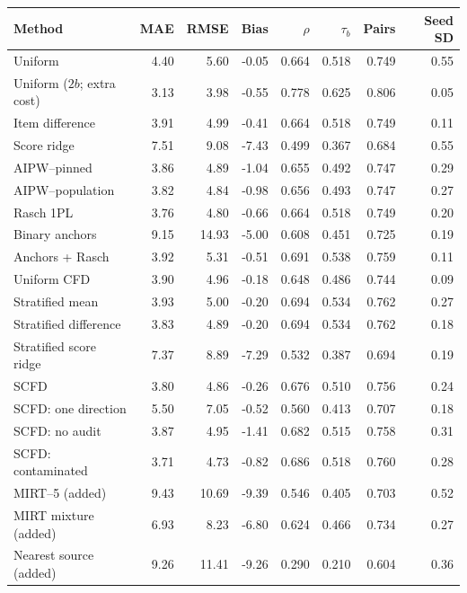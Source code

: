 \begin{tabular}{lrrrrrrr}
\toprule
Method & MAE & RMSE & Bias & $\rho$ & $\tau_b$ & Pairs & Seed SD \\
\midrule
Uniform & 4.40 & 5.60 & -0.05 & 0.664 & 0.518 & 0.749 & 0.55 \\
Uniform ($2b$; extra cost) & 3.13 & 3.98 & -0.55 & 0.778 & 0.625 & 0.806 & 0.05 \\
Item difference & 3.91 & 4.99 & -0.41 & 0.664 & 0.518 & 0.749 & 0.11 \\
Score ridge & 7.51 & 9.08 & -7.43 & 0.499 & 0.367 & 0.684 & 0.55 \\
AIPW--pinned & 3.86 & 4.89 & -1.04 & 0.655 & 0.492 & 0.747 & 0.29 \\
AIPW--population & 3.82 & 4.84 & -0.98 & 0.656 & 0.493 & 0.747 & 0.27 \\
Rasch 1PL & 3.76 & 4.80 & -0.66 & 0.664 & 0.518 & 0.749 & 0.20 \\
Binary anchors & 9.15 & 14.93 & -5.00 & 0.608 & 0.451 & 0.725 & 0.19 \\
Anchors + Rasch & 3.92 & 5.31 & -0.51 & 0.691 & 0.538 & 0.759 & 0.11 \\
Uniform CFD & 3.90 & 4.96 & -0.18 & 0.648 & 0.486 & 0.744 & 0.09 \\
Stratified mean & 3.93 & 5.00 & -0.20 & 0.694 & 0.534 & 0.762 & 0.27 \\
Stratified difference & 3.83 & 4.89 & -0.20 & 0.694 & 0.534 & 0.762 & 0.18 \\
Stratified score ridge & 7.37 & 8.89 & -7.29 & 0.532 & 0.387 & 0.694 & 0.19 \\
SCFD & 3.80 & 4.86 & -0.26 & 0.676 & 0.510 & 0.756 & 0.24 \\
SCFD: one direction & 5.50 & 7.05 & -0.52 & 0.560 & 0.413 & 0.707 & 0.18 \\
SCFD: no audit & 3.87 & 4.95 & -1.41 & 0.682 & 0.515 & 0.758 & 0.31 \\
SCFD: contaminated & 3.71 & 4.73 & -0.82 & 0.686 & 0.518 & 0.760 & 0.28 \\
MIRT--5 (added) & 9.43 & 10.69 & -9.39 & 0.546 & 0.405 & 0.703 & 0.52 \\
MIRT mixture (added) & 6.93 & 8.23 & -6.80 & 0.624 & 0.466 & 0.734 & 0.27 \\
Nearest source (added) & 9.26 & 11.41 & -9.26 & 0.290 & 0.210 & 0.604 & 0.36 \\
\bottomrule
\end{tabular}

